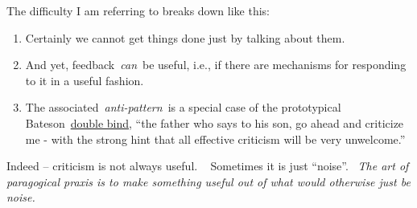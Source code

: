 The difficulty I am referring to breaks down like this:

\begin{enumerate}
\item
  Certainly we cannot get things done just by talking about them.
\item
  And yet, feedback~\emph{can}~be useful, i.e., if there are mechanisms
  for responding to it in a useful fashion.
\item
  The associated~\emph{anti-pattern}~is a special case of the
  prototypical
  Bateson~\href{http://en.wikipedia.org/wiki/Double\_bind}{double bind},
  ``the father who says to his son, go ahead and criticize me - with the
  strong hint that all effective criticism will be very unwelcome.''
\end{enumerate}

Indeed -- criticism is not always useful. ~ Sometimes it is just
``noise''. ~\emph{The art of paragogical praxis is to make something
useful out of what would otherwise just be noise.}
